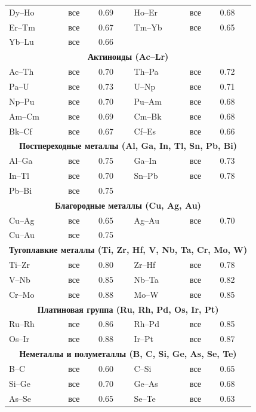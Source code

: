 \documentclass[12pt,a4paper]{article}
\begin{document}
\begin{longtable}{p{2.5cm} p{2.5cm} p{1.2cm} p{2.5cm} p{2.5cm} p{1.2cm}}
		Dy–Ho & все & 0.69 & Ho–Er & все & 0.68 \\
		Er–Tm & все & 0.67 & Tm–Yb & все & 0.65 \\
		Yb–Lu & все & 0.66 & & & \\
		\multicolumn{6}{c}{\textbf{Актиноиды (Ac–Lr)}} \\
		Ac–Th & все & 0.70 & Th–Pa & все & 0.72 \\
		Pa–U  & все & 0.73 & U–Np & все & 0.71 \\
		Np–Pu & все & 0.70 & Pu–Am & все & 0.68 \\
		Am–Cm & все & 0.69 & Cm–Bk & все & 0.68 \\
		Bk–Cf & все & 0.67 & Cf–Es & все & 0.66 \\
		\multicolumn{6}{c}{\textbf{Постпереходные металлы (Al, Ga, In, Tl, Sn, Pb, Bi)}} \\
		Al–Ga & все & 0.75 & Ga–In & все & 0.73 \\
		In–Tl & все & 0.70 & Sn–Pb & все & 0.78 \\
		Pb–Bi & все & 0.75 & & & \\
		\multicolumn{6}{c}{\textbf{Благородные металлы (Cu, Ag, Au)}} \\
		Cu–Ag & все & 0.65 & Ag–Au & все & 0.70 \\
		Cu–Au & все & 0.75 & & & \\
		\multicolumn{6}{c}{\textbf{Тугоплавкие металлы (Ti, Zr, Hf, V, Nb, Ta, Cr, Mo, W)}} \\
		Ti–Zr & все & 0.80 & Zr–Hf & все & 0.78 \\
		V–Nb & все & 0.85 & Nb–Ta & все & 0.82 \\
		Cr–Mo & все & 0.88 & Mo–W & все & 0.85 \\
		\multicolumn{6}{c}{\textbf{Платиновая группа (Ru, Rh, Pd, Os, Ir, Pt)}} \\
		Ru–Rh & все & 0.86 & Rh–Pd & все & 0.85 \\
		Os–Ir & все & 0.88 & Ir–Pt & все & 0.87 \\
		\multicolumn{6}{c}{\textbf{Неметаллы и полуметаллы (B, C, Si, Ge, As, Se, Te)}} \\
		B–C  & все & 0.60 & C–Si  & все & 0.65 \\
		Si–Ge & все & 0.70 & Ge–As & все & 0.68 \\
		As–Se & все & 0.65 & Se–Te & все & 0.63 \\
		\bottomrule
	\end{longtable}
	
\end{document}
